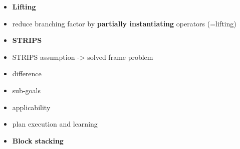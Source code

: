 \begin{itemize}
\item \textbf{Lifting}
\item reduce branching factor by \textbf{partially instantiating} operators (=lifting)


\item \textbf{STRIPS}
\item STRIPS assumption -> solved frame problem
\item difference
\item sub-goals
\item applicability
\item plan execution and learning

\item \textbf{Block stacking}


\end{itemize}